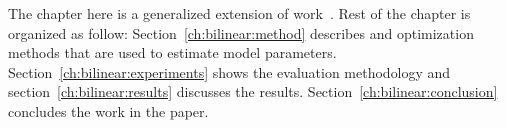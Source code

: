 The chapter here is a generalized extension of work~\cite{r43}. 
Rest of the chapter is organized as follow: 
Section~\ref{ch:bilinear:method} %
describes \CF and optimization methods that are used to estimate
model parameters. Section~\ref{ch:bilinear:experiments}  %
shows the evaluation methodology and section~\ref{ch:bilinear:results} %
discusses the results. 
Section~\ref{ch:bilinear:conclusion} %
concludes the work in the paper.
